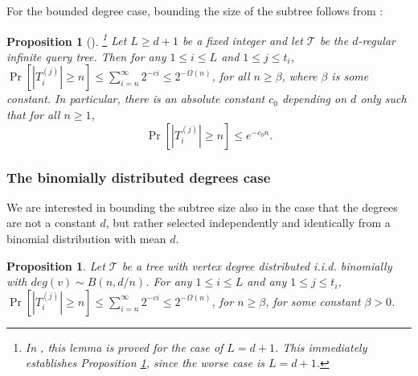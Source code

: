 \documentclass[english, oribibl]{llncs}
\newtheorem{proposition}[theorem]{Proposition}
\newcommand{\mygamma}{L}
\begin{document}
For the bounded degree case, bounding the size of the subtree follows from \cite{ARV+11}:





\begin{proposition} [\cite{ARV+11}] \footnote{In \cite{ARV+11}, this lemma is proved for the case of $\mygamma=d+1$. This immediately establishes Proposition \ref{lemma:bounded}, since the worse case is $\mygamma=d+1$.}
\label{lemma:bounded}
Let $L\geq d+1$ be a fixed integer
and let $\mathcal{T}$ be the $d$-regular infinite query tree.
Then for any $1\leq i \leq \mygamma$ and $1 \leq j \leq t_i$,
$\Pr[|T_i^{(j)}|\geq n]\leq \sum_{i=n}^{\infty}2^{-ci}\leq 2^{-\Omega(n)}$,
for all $n \geq \beta$, where $\beta$ is some constant.
In particular, there is an absolute constant $c_{0}$ depending on $d$ only such that
for all $n\geq 1$,
\[
\Pr[|T_i^{(j)}|\geq n]\leq e^{-c_{0}n}.
\]
\end{proposition}



\subsubsection{The binomially distributed degrees case}
\label{subtree_app}

We are interested in bounding the subtree size also in the case that the degrees are not a constant $d$, but rather selected independently and identically from a binomial distribution with mean $d$.
\begin{proposition}
\label{lemma:binomial}
 Let $\mathcal{T}$ be a tree with vertex degree distributed i.i.d. binomially with $deg(v) \sim B(n,d/n)$. For any $1 \leq i \leq \mygamma$ and any $1 \leq j \leq t_i$,
$\Pr[|T_i^{(j)}|\geq n]\leq \sum_{i=n}^{\infty}2^{-ci}\leq 2^{-\Omega(n)}$,
 for $n \geq \beta$, for some constant $\beta > 0$.
\end{proposition}
\end{document}
